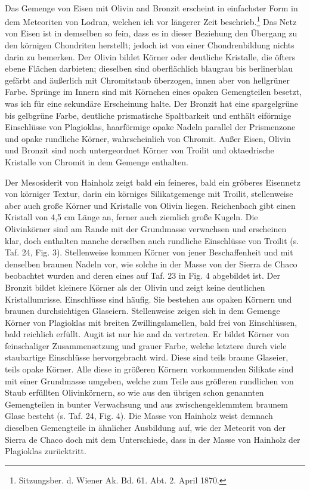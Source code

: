 \documentclass[a4paper, 12pt, oneside]{article}
\begin{document}
\paragraph{}
Das Gemenge von Eisen mit Olivin and Bronzit erscheint in einfachster Form in dem Meteoriten von Lodran, welchen ich vor längerer Zeit beschrieb.\footnote{Sitzungsber. d. Wiener Ak. Bd. 61. Abt. 2. April 1870.} Das Netz von Eisen ist in demselben so fein, dass es in dieser Beziehung den Übergang zu den körnigen Chondriten herstellt; jedoch ist von einer Chondrenbildung nichts darin zu bemerken. Der Olivin bildet Körner oder deutliche Kristalle, die öfters ebene Flächen darbieten; dieselben sind oberflächlich blaugrau bis berlinerblau gefärbt and äußerlich mit Chromitstaub überzogen, innen aber von hellgrüner Farbe. Sprünge im Innern sind mit Körnchen eines opaken Gemengteilen besetzt, was ich für eine sekundäre Erscheinung halte. Der Bronzit hat eine spargelgrüne bis gelbgrüne Farbe, deutliche prismatische Spaltbarkeit und enthält eiförmige Einschlüsse von Plagioklas, haarförmige opake Nadeln parallel der Prismenzone und opake rundliche Körner, wahrscheinlich von Chromit. Außer Eisen, Olivin und Bronzit sind noch untergeordnet Körner von Troilit und oktaedrische Kristalle von Chromit in dem Gemenge enthalten.

Der Mesosiderit von Hainholz zeigt bald ein feineres, bald ein gröberes Eisennetz von körniger Textur, darin ein körniges Silikatgemenge mit Troilit, stellenweise aber auch große Körner und Kristalle von Olivin liegen. Reichenbach gibt einen Kristall von 4,5 cm Länge an, ferner auch ziemlich große Kugeln. Die Olivinkörner sind am Rande mit der Grundmasse verwachsen und erscheinen klar, doch enthalten manche derselben auch rundliche Einschlüsse von Troilit (s. Taf. 24, Fig. 3). Stellenweise kommen Körner von jener Beschaffenheit und mit denselben braunen Nadeln vor, wie solche in der Masse von der Sierra de Chaco beobachtet wurden and deren eines auf Taf. 23 in Fig. 4 abgebildet ist. Der Bronzit bildet kleinere Körner als der Olivin und zeigt keine deutlichen Kristallumrisse. Einschlüsse sind häufig. Sie bestehen aus opaken Körnern und braunen durchsichtigen Glaseiern. Stellenweise zeigen sich in dem Gemenge Körner von Plagioklas mit breiten Zwillingslamellen, bald frei von Einschlüssen, bald reichlich erfüllt. Augit ist nur hie and da vertreten. Er bildet Körner von feinschaliger Zusammensetzung und grauer Farbe, welche letztere durch viele staubartige Einschlüsse hervorgebracht wird. Diese sind teils braune Glaseier, teils opake Körner. Alle diese in größeren Körnern vorkommenden Silikate sind mit einer Grundmasse umgeben, welche zum Teile aus größeren rundlichen von Staub erfüllten Olivinkörnern, so wie aus den übrigen schon genannten Gemengteilen in bunter Verwachsung und aus zwischengeklemmtem braunem Glase besteht (s. Taf. 24, Fig. 4). Die Masse von Hainholz weist demnach dieselben Gemengteile in ähnlicher Ausbildung auf, wie der Meteorit von der Sierra de Chaco doch mit dem Unterschiede, dass in der Masse von Hainholz der Plagioklas zurücktritt.
\end{document}
